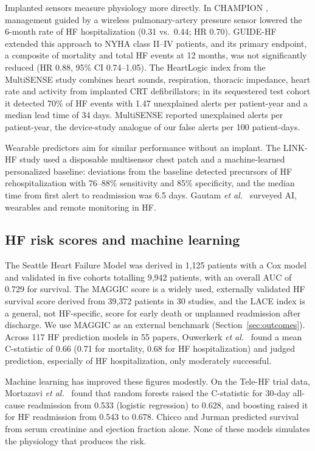 \documentclass[conference]{IEEEtran}
\begin{document}
Implanted sensors measure physiology more directly. In CHAMPION \cite{abraham2011champion}, management guided by a wireless pulmonary-artery pressure sensor lowered the 6-month rate of HF hospitalization (0.31 vs.\ 0.44; HR 0.70). GUIDE-HF \cite{lindenfeld2021guidehf} extended this approach to NYHA class II--IV patients, and its primary endpoint, a composite of mortality and total HF events at 12 months, was not significantly reduced (HR 0.88, 95\% CI 0.74--1.05). The HeartLogic index from the MultiSENSE study \cite{boehmer2017multisense} combines heart sounds, respiration, thoracic impedance, heart rate and activity from implanted CRT defibrillators; in its sequestered test cohort it detected 70\% of HF events with 1.47 unexplained alerts per patient-year and a median lead time of 34 days. MultiSENSE reported unexplained alerts per patient-year, the device-study analogue of our false alerts per 100 patient-days.

Wearable predictors aim for similar performance without an implant. The LINK-HF study \cite{stehlik2020linkhf} used a disposable multisensor chest patch and a machine-learned personalized baseline: deviations from the baseline detected precursors of HF rehospitalization with 76--88\% sensitivity and 85\% specificity, and the median time from first alert to readmission was 6.5 days. Gautam \textit{et al.}\ \cite{gautam2022wearables} surveyed AI, wearables and remote monitoring in HF.

\subsection{HF risk scores and machine learning}\label{sec:rel-risk}
The Seattle Heart Failure Model \cite{levy2006shfm} was derived in 1,125 patients with a Cox model and validated in five cohorts totalling 9,942 patients, with an overall AUC of 0.729 for survival. The MAGGIC score \cite{pocock2013maggic} is a widely used, externally validated HF survival score derived from 39,372 patients in 30 studies, and the LACE index \cite{vanwalraven2010lace} is a general, not HF-specific, score for early death or unplanned readmission after discharge. We use MAGGIC as an external benchmark (Section~\ref{sec:outcomes}). Across 117 HF prediction models in 55 papers, Ouwerkerk \textit{et al.}\ \cite{ouwerkerk2014models} found a mean C-statistic of 0.66 (0.71 for mortality, 0.68 for HF hospitalization) and judged prediction, especially of HF hospitalization, only moderately successful.

Machine learning has improved these figures modestly. On the Tele-HF trial data, Mortazavi \textit{et al.}\ \cite{mortazavi2016ml} found that random forests raised the C-statistic for 30-day all-cause readmission from 0.533 (logistic regression) to 0.628, and boosting raised it for HF readmission from 0.543 to 0.678. Chicco and Jurman \cite{chicco2020hf} predicted survival from serum creatinine and ejection fraction alone. None of these models simulates the physiology that produces the risk.
\end{document}
